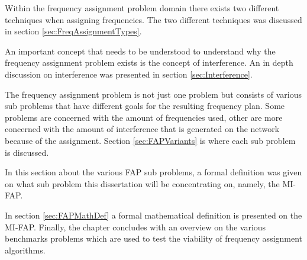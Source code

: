 Within the frequency assignment problem domain there exists two different techniques when assigning frequencies. The two different techniques was discussed in section \ref{sec:FreqAssignmentTypes}. 

An important concept that needs to be understood to understand why the frequency assignment problem exists is the concept of interference. An in depth discussion on interference was presented in section \ref{sec:Interference}.

The frequency assignment problem is not just one problem but consists of various sub problems that have different goals for the resulting frequency plan. Some problems are concerned with the amount of frequencies used, other are more concerned with the amount of interference that is generated on the network because of the assignment. Section \ref{sec:FAPVariants} is where each sub problem is discussed. 

In this section about the various FAP sub problems, a formal definition was given on what sub problem this dissertation will be concentrating on, namely, the MI-FAP.

In section \ref{sec:FAPMathDef} a formal mathematical definition is presented on the MI-FAP.  Finally, the chapter concludes with an overview on the various benchmarks problems which are used to test the viability of frequency assignment algorithms.
